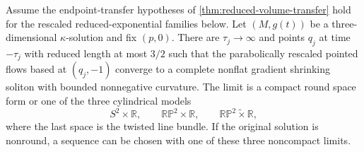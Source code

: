 \begin{theorem}
\label{thm:kappa-solution-asymptotic-models}
\notready
Assume the endpoint-transfer hypotheses of \ref{thm:reduced-volume-transfer}
hold for the rescaled reduced-exponential families below.  Let $(M,g(t))$ be
a three-dimensional $\kappa$-solution and fix $(p,0)$.
There are $\tau_j\to\infty$ and points $q_j$ at time $-\tau_j$ with reduced
length at most $3/2$ such that the parabolically rescaled pointed flows based
at $(q_j,-1)$ converge to a complete nonflat gradient shrinking soliton with
bounded nonnegative curvature.  The limit is a compact round space form or
one of the three cylindrical models
\[
 S^2\times\mathbb R,\qquad
 \mathbb{RP}^2\times\mathbb R,\qquad
 \mathbb{RP}^2\widetilde\times\mathbb R,
\]
where the last space is the twisted line bundle.  If the original solution
is nonround, a sequence can be chosen with one of these three noncompact
limits.
\end{theorem}

